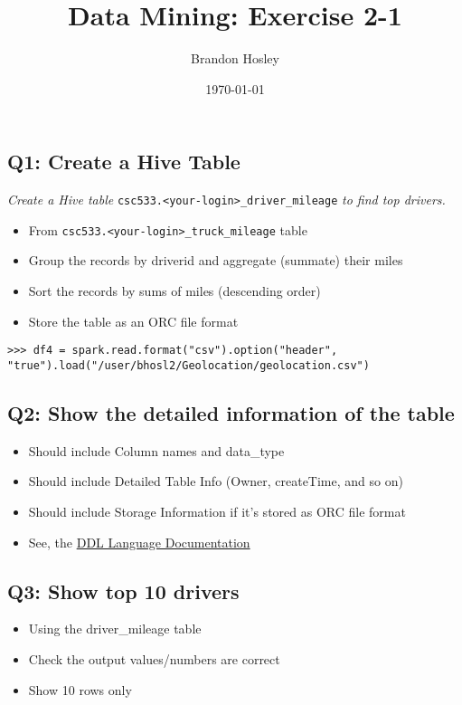 \documentclass[]{article}
\title{Data Mining: Exercise 2-1}
\author{Brandon Hosley}
\date{\today}
\begin{document}
\maketitle

\vspace{3em}

\subsection*{Q1: Create a Hive Table}
\emph{Create a Hive table}
\texttt{csc533.<your-login>_driver_mileage}
\emph{to find top drivers.} \\
	\begin{itemize}[before=\itshape,font=\normalfont]
		\item From \textnormal{\texttt{csc533.<your-login>_truck_mileage}} table
		\item Group the records by driverid and aggregate (summate) their miles
		\item Sort the records by sums of miles (descending order)
		\item Store the table as an ORC file format
	\end{itemize} 

\begin{verbatim}
>>> df4 = spark.read.format("csv").option("header", "true").load("/user/bhosl2/Geolocation/geolocation.csv")
\end{verbatim}

\subsection*{Q2: Show the detailed information of the table}
\begin{itemize}[before=\itshape,font=\normalfont]
	\item Should include Column names and data\_type
	\item Should include Detailed Table Info (Owner, createTime, and so on)
	\item Should include Storage Information if it’s stored as ORC file format
	\item See, the \href{https://cwiki.apache.org/confluence/display/Hive/LanguageManual+DDL#LanguageMan
		ualDDL-DescribeTable/View/MaterializedView/Column}{DDL Language Documentation}
\end{itemize} 
 
\subsection*{Q3: Show top 10 drivers}
\begin{itemize}[before=\itshape,font=\normalfont]
	\item Using the driver\_mileage table
	\item Check the output values/numbers are correct
	\item Show 10 rows only
\end{itemize} 
\end{document}
